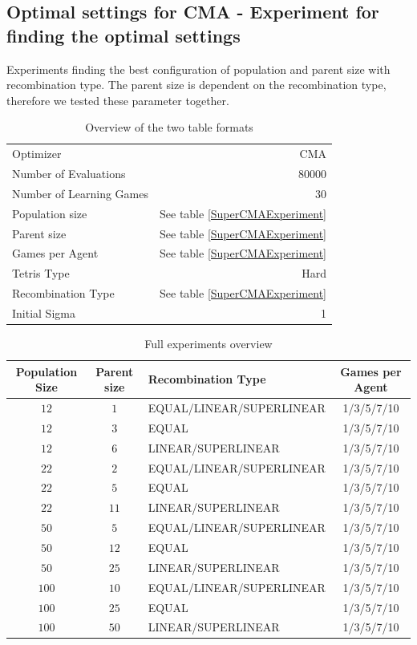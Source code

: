 \clearpage

\subsection{Optimal settings for CMA - Experiment for finding the optimal settings}
Experiments finding the best configuration of population and parent size with recombination type. The parent size is dependent on the recombination type, therefore we tested these parameter together.
\begin{table}[h]
\centering
\caption{Overview of the two table formats}
\begin{tabular}{l r}
Optimizer & CMA\\
Number of Evaluations & 80000\\
Number of Learning Games &30\\
Population size& See table \ref{SuperCMAExperiment}\\
Parent size & See table \ref{SuperCMAExperiment}\\
Games per Agent & See table \ref{SuperCMAExperiment}\\
Tetris Type & Hard\\
\hline
Recombination Type & See table \ref{SuperCMAExperiment}\\
Initial Sigma & 1
\end{tabular}
\end{table}

\begin{table}[H]
\centering
\begin{tabular}{c c l c}
Population Size & Parent size & Recombination Type & Games per Agent\\
\hline
$12$ & $1$ & EQUAL/LINEAR/SUPERLINEAR & 1/3/5/7/10\\
$12$ & $3$ & EQUAL & 1/3/5/7/10\\
$12$ & $6$ & LINEAR/SUPERLINEAR & 1/3/5/7/10\\
$22$ & $2$ & EQUAL/LINEAR/SUPERLINEAR & 1/3/5/7/10\\
$22$ & $5$ & EQUAL & 1/3/5/7/10\\
$22$ & $11$ & LINEAR/SUPERLINEAR & 1/3/5/7/10\\
$50$ & $5$ & EQUAL/LINEAR/SUPERLINEAR & 1/3/5/7/10\\
$50$ & $12$ & EQUAL & 1/3/5/7/10\\
$50$ & $25$ & LINEAR/SUPERLINEAR & 1/3/5/7/10\\
$100$ & $10$ & EQUAL/LINEAR/SUPERLINEAR & 1/3/5/7/10\\
$100$ & $25$ & EQUAL & 1/3/5/7/10\\
$100$ & $50$ & LINEAR/SUPERLINEAR & 1/3/5/7/10
\end{tabular}
\caption{Full experiments overview \label{SuperCMAExperimentAppendix}}
\end{table}


